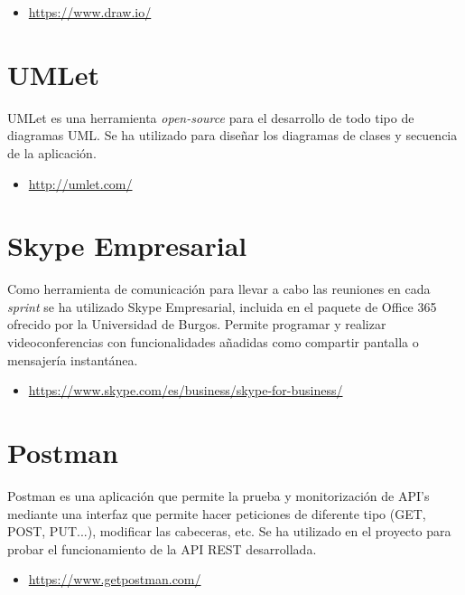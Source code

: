 \begin{itemize}
	\item \url{https://www.draw.io/}
\end{itemize}

\section{UMLet}

UMLet es una herramienta \textit{open-source} para el desarrollo de todo tipo de diagramas UML. Se ha utilizado para diseñar los diagramas de clases y secuencia de la aplicación.

\begin{itemize}
	\item \url{http://umlet.com/}
\end{itemize}

\section{Skype Empresarial}

Como herramienta de comunicación para llevar a cabo las reuniones en cada \textit{sprint} se ha utilizado Skype Empresarial, incluida en el paquete de Office 365 ofrecido por la Universidad de Burgos. Permite programar y realizar videoconferencias con funcionalidades añadidas como compartir pantalla o mensajería instantánea.

\begin{itemize}
	\item \url{https://www.skype.com/es/business/skype-for-business/}
\end{itemize}

\section{Postman}

Postman es una aplicación que permite la prueba y monitorización de API's mediante una interfaz que permite hacer peticiones de diferente tipo (GET, POST, PUT...), modificar las cabeceras, etc. Se ha utilizado en el proyecto para probar el funcionamiento de la API REST desarrollada.

\begin{itemize}
	\item \url{https://www.getpostman.com/}
\end{itemize}